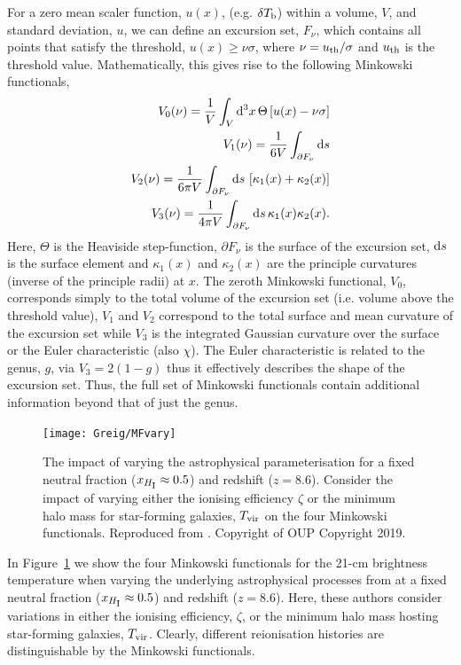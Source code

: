 For a zero mean scaler function, $u(x)$, (e.g. $\delta T_{\rm b}$) within a volume, $V$, and standard deviation, $u$, we can define an excursion set, $F_{\nu}$, which contains all points that satisfy the threshold, $u(x) \geq \nu\sigma$, where $\nu = u_{\rm th}/\sigma$ and $u_{\rm th}$ is the threshold value. Mathematically, this gives rise to the following Minkowski functionals,
\begin{eqnarray}
V_{0}(\nu) = \frac{1}{V}\int_{V} {\rm d^3}x\,\Theta\left[u(x) - \nu \sigma\right] \\
V_{1}(\nu) = \frac{1}{6V}\int_{\partial F_{\nu}} {\rm d}s \\
V_{2}(\nu) = \frac{1}{6\pi V}\int_{\partial F_{\nu}} {\rm d}s\,\left[\kappa_{1}(x) + \kappa_{2}(x)\right] \\
V_{3}(\nu) = \frac{1}{4\pi V}\int_{\partial F_{\nu}} {\rm d}s\, \kappa_{1}(x)\kappa_{2}(x).
\end{eqnarray}
Here, $\Theta$ is the Heaviside step-function, $\partial F_{\nu}$ is the surface of the excursion set, ${\rm d}s$ is the surface element and $\kappa_{1}(x)$ and  $\kappa_{2}(x)$ are the principle curvatures (inverse of the principle radii) at $x$. The zeroth Minkowski functional, $V_{0}$, corresponds simply to the total volume of the excursion set (i.e. volume above the threshold value), $V_{1}$ and $V_{2}$ correspond to the total surface and mean curvature of the excursion set while $V_{3}$ is the integrated Gaussian curvature over the surface or the Euler characteristic (also $\chi$). The Euler characteristic is related to the genus, $g$, via $V_{3} = 2(1-g)$ thus it effectively describes the shape of the excursion set. Thus, the full set of Minkowski functionals contain additional information beyond that of just the genus.

\begin{figure}[]
\begin{center}
\texttt{[image: Greig/MFvary]}
\end{center}
\caption{The impact of varying the astrophysical parameterisation for a fixed neutral fraction ($x_{H_{\rm \scriptstyle I}}\approx 0.5$) and redshift ($z=8.6$). Consider the impact of varying either the ionising efficiency $\zeta$ or the minimum halo mass for star-forming galaxies, $T_{\rm vir}$ on the four Minkowski functionals. Reproduced from \cite{Yoshiura:2017}. Copyright of OUP Copyright 2019.}
\label{fig:MFs}
\end{figure}

In Figure~\ref{fig:MFs} we show the four Minkowski functionals for the 21-cm brightness temperature when varying the underlying astrophysical processes from \cite{Yoshiura:2017} at a fixed neutral fraction ($x_{H_{\rm \scriptstyle I}}\approx 0.5$) and redshift ($z=8.6$). Here, these authors consider variations in either the ionising efficiency, $\zeta$, or the minimum halo mass hosting star-forming galaxies, $T_{\rm vir}$. Clearly, different reionisation histories are distinguishable by the Minkowski functionals.

